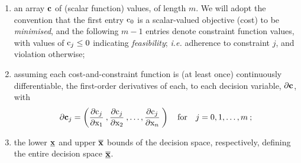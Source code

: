 \documentclass[11pt]{article}
\begin{document}
\begin{enumerate}[label=(\roman*)]
  \item an array $\mathbf{c}$ of (scalar function) values, of length $m$. We will adopt the convention that the first entry $\textrm{c}_0$ is a scalar-valued objective (cost) to be \emph{minimised}, and the following $m-1$ entries denote constraint function values, with values of $\textrm{c}_j \leq 0$ indicating \emph{feasibility}; \emph{i.e.} adherence to constraint $j$, and violation otherwise;
  \item assuming each cost-and-constraint function is (at least once) continuously differentiable, the first-order derivatives of each, to each decision variable, $\mathbf{\partial c}$, with
\begin{equation}
\mathbf{\partial c }_j = \left( \frac{\partial \textrm{c}_j}{\partial \textrm{x}_1 } \:,  \frac{\partial \textrm{c}_j}{\partial \textrm{x}_2} \: , \ldots,  \frac{\partial \textrm{c}_j}{\partial \textrm{x}_n} \: \right) \quad \text{for} \quad j = 0,1, \ldots, m \:;
\end{equation}
  \item the  lower $\underline{\mathbf{x}}$ and upper $\overline{\mathbf{x}}$ bounds
 of the decision space, respectively, defining the entire decision space $\underline{\overline{\mathbf{x}}}$.
\end{enumerate}
\end{document}
